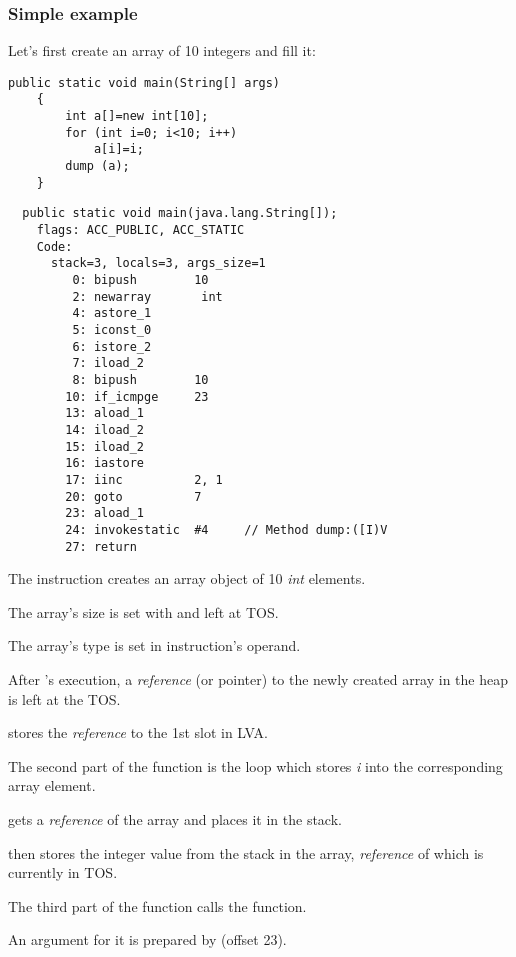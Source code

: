 \subsubsection{Simple example}

Let's first create an array of 10 integers and fill it:

\begin{lstlisting}[style=customjava]
	public static void main(String[] args) 
	{
		int a[]=new int[10];
		for (int i=0; i<10; i++)
			a[i]=i;
		dump (a);
	}
\end{lstlisting}

\begin{lstlisting}
  public static void main(java.lang.String[]);
    flags: ACC_PUBLIC, ACC_STATIC
    Code:
      stack=3, locals=3, args_size=1
         0: bipush        10
         2: newarray       int
         4: astore_1      
         5: iconst_0      
         6: istore_2      
         7: iload_2       
         8: bipush        10
        10: if_icmpge     23
        13: aload_1       
        14: iload_2       
        15: iload_2       
        16: iastore       
        17: iinc          2, 1
        20: goto          7
        23: aload_1       
        24: invokestatic  #4     // Method dump:([I)V
        27: return        
\end{lstlisting}

The  instruction creates an array object of 10 \emph{int} elements.

The array's size is set with  and left at \ac{TOS}.

The array's type is set in  instruction's operand.

After 's execution, a \emph{reference} (or pointer) to the newly created array in the heap 
is left at the \ac{TOS}.

 stores the \emph{reference} to the 1st slot in \ac{LVA}.

The second part of the \main function is the loop which stores \emph{i} into the corresponding
array element.

 gets a \emph{reference} of the array and places it in the stack.

 then stores the integer value from the stack in the array, 
\emph{reference} of which is currently in \ac{TOS}.

The third part of the \main function calls the  function.

An argument for it is prepared by  (offset 23).

